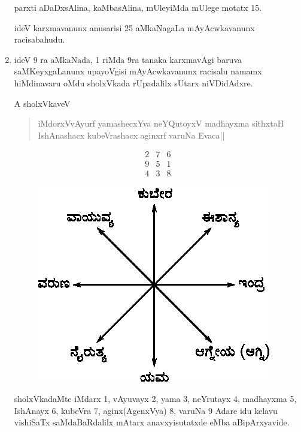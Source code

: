 \begin{enumerate}[{\rm I.}]
parxti aDaDxsAlina, kaMbasAlina, mUleyiMda mUlege motatx {\rm 15}.

ideV karxmavanunx anusarisi {\rm 25} aMkaNagaLa mAyAcwkavanunx racisabahudu.

\item ideV {\rm 9} ra aMkaNada, {\rm 1} riMda {\rm 9}ra tanaka karxmavAgi baruva saMKeyxgaLanunx upayoVgisi mAyAcwkavanunx racisalu namamx hiMdinavaru oMdu sholxVkada rUpadalilx sUtarx niVDidAdxre.

A sholxVkaveV
\begin{verse}
iMdorxVvAyurf yamashecxYva neYQutoyxV madhayxma sithxtaH\\ 
IshAnashacx kubeVrashacx aginxrf varuNa Evaca||
\end{verse}
$$
\begin{matrix}
2 & 7 & 6\\
9 & 5 & 1\\
4 & 3 & 8
\end{matrix}
$$

\begin{figure}[H]
\centering
\includegraphics[scale=.6]{src/figures/m_117.eps}
\end{figure}

sholxVkadaMte iMdarx {\rm 1}, vAyuvayx {\rm 2}, yama {\rm 3}, neYrutayx {\rm 4}, madhayxma {\rm 5}, IshAnayx {\rm 6}, kubeVra {\rm 7}, aginx(AgenxVya) {\rm 8}, varuNa {\rm 9} Adare idu kelavu vishiSaTx saMdaBaRdalilx mAtarx anavxyisutatxde eMba aBipArxyavide.


\end{enumerate}
